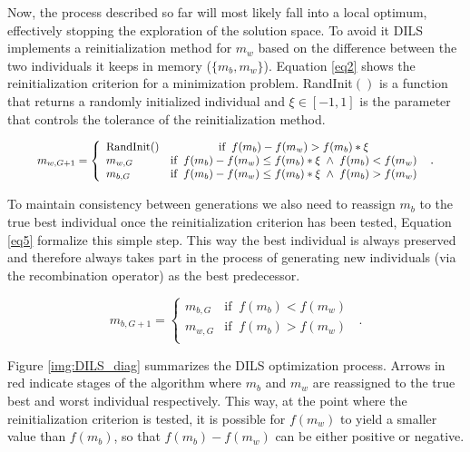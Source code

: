 \documentclass[review]{elsarticle}
\begin{document}
Now, the process described so far will most likely fall into a local optimum, effectively stopping the exploration of the solution space. To avoid it DILS implements a reinitialization method for $m_w$ based on the difference between the two individuals it keeps in memory ($\{m_b, m_w\}$). Equation \ref{eq2} shows the reinitialization criterion for a minimization problem. RandInit$()$ is a function that returns a randomly initialized individual and $\xi \in [-1,1]$ is the parameter that controls the tolerance of the reinitialization method.

\begin{equation}
\resizebox{0.9 \textwidth}{!}{$
m_{w,G+1} = \left\{ \begin{array}{lc}
\text{RandInit}() &   \text{if} \;\; f(m_b) - f(m_w) > f(m_b) * \xi \;\;\\
m_{w,G} &  \text{if} \;\; f(m_b) - f(m_w) \le f(m_b) * \xi \; \wedge \; f(m_b) < f(m_w) \;\;\\
m_{b,G} &  \text{if} \;\; f(m_b) - f(m_w) \le f(m_b) * \xi \; \wedge \; f(m_b) > f(m_w) \;\;\\
\end{array}
\right.$}.
\label{eq2}
\end{equation}

To maintain consistency between generations we also need to reassign $m_b$ to the true best individual once the reinitialization criterion has been tested, Equation \ref{eq5} formalize this simple step. This way the best individual is always preserved and therefore always takes part in the process of generating new individuals (via the recombination operator) as the best predecessor. 

\begin{equation}
m_{b,G+1} = \left\{ \begin{array}{lc}
m_{b,G} &  \text{if} \;\; f(m_b) < f(m_w) \;\;\\
m_{w,G} &  \text{if} \;\; f(m_b) > f(m_w) \;\;\\
\end{array}
\right..
\label{eq5}
\end{equation}

Figure \ref{img:DILS_diag} summarizes the DILS optimization process. Arrows in red indicate stages of the algorithm where $m_b$ and $m_w$ are reassigned to the true best and worst individual respectively. This way, at the point where the reinitialization criterion is tested, it is possible for $f(m_w)$ to yield a smaller value than $f(m_b)$, so that $f(m_b) - f(m_w)$ can be either positive or negative. 
\end{document}
